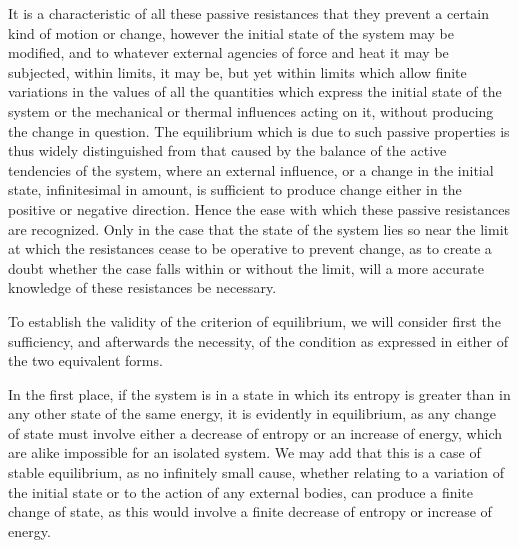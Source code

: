\documentclass[11pt]{article}
\begin{document}
It is a characteristic of all these passive resistances that they prevent a certain kind of motion or change, however the initial state of the system may be modified, and to whatever external agencies of force and heat it may be subjected, within limits, it may be, but yet within limits which allow finite variations in the values of all the quantities which express the initial state of the system or the mechanical or thermal influences acting on it, without producing the change in question. The equilibrium which is due to such passive properties is thus widely distinguished from that caused by the balance of the active tendencies of the system, where an external influence, or a change in the initial state, infinitesimal in amount, is sufficient to produce change either in the positive or negative direction. Hence the ease with which these passive resistances are recognized. Only in the case that the state of the system lies so near the limit at which the resistances cease to be operative to prevent change, as to create a doubt whether the case falls within or without the limit, will a more accurate knowledge of these resistances be necessary.

To establish the validity of the criterion of equilibrium, we will consider first the sufficiency, and afterwards the necessity, of the condition as expressed in either of the two equivalent forms.

In the first place, if the system is in a state in which its entropy is greater than in any other state of the same energy, it is evidently in equilibrium, as any change of state must involve either a decrease of entropy or an increase of energy, which are alike impossible for an isolated system. We may add that this is a case of stable equilibrium, as no infinitely small cause, whether relating to a variation of the initial state or to the action of any external bodies, can produce a finite change of state, as this would involve a finite decrease of entropy or increase of energy.
\end{document}
